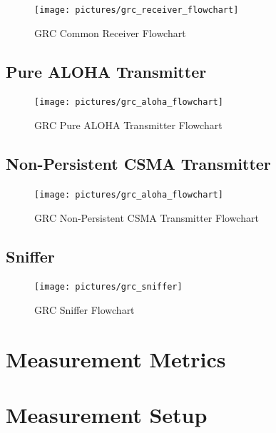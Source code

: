 \begin{figure}[ht]
	\label{fig:grc-receiver}
	\begin{center}
		\texttt{[image: pictures/grc\_receiver\_flowchart]}
	\end{center}
	\caption{GRC Common Receiver Flowchart}
\end{figure}

\subsection{Pure ALOHA Transmitter}

\begin{figure}[h]
	\label{fig:grc-aloha-sender}
	\begin{center}
		\texttt{[image: pictures/grc\_aloha\_flowchart]}
\end{center}
\caption{GRC Pure ALOHA Transmitter Flowchart}
\end{figure}

\subsection{Non-Persistent CSMA Transmitter}

\begin{figure}[h]
	\label{fig:grc-csma-sender}
	\begin{center}
		\texttt{[image: pictures/grc\_aloha\_flowchart]}
\end{center}
\caption{GRC Non-Persistent CSMA Transmitter Flowchart}
\end{figure}

\subsection{Sniffer}

\begin{figure}[h]
	\label{fig:grc-sniffer}
	\begin{center}
		\texttt{[image: pictures/grc\_sniffer]}
	\end{center}
	\caption{GRC Sniffer Flowchart}
\end{figure}

\section{Measurement Metrics}

\section{Measurement Setup}

